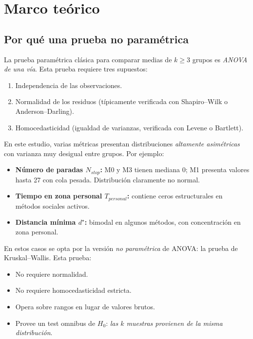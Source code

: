 \documentclass[12pt,a4paper,oneside]{book}
\begin{document}
\section{Marco teórico}

\subsection{Por qué una prueba no paramétrica}

La prueba paramétrica clásica para comparar medias de $k\geq 3$ grupos es \emph{ANOVA de una vía}. Esta prueba requiere tres supuestos:
\begin{enumerate}
    \item Independencia de las observaciones.
    \item Normalidad de los residuos (típicamente verificada con Shapiro--Wilk o Anderson--Darling).
    \item Homocedasticidad (igualdad de varianzas, verificada con Levene o Bartlett).
\end{enumerate}

En este estudio, varias métricas presentan distribuciones \emph{altamente asimétricas} con varianza muy desigual entre grupos. Por ejemplo:

\begin{itemize}
    \item \textbf{Número de paradas $N_{stop}$:} M0 y M3 tienen mediana 0; M1 presenta valores hasta 27 con cola pesada. Distribución claramente no normal.
    \item \textbf{Tiempo en zona personal $T_{personal}$:} contiene ceros estructurales en métodos sociales activos.
    \item \textbf{Distancia mínima $d^\star$:} bimodal en algunos métodos, con concentración en zona personal.
\end{itemize}

En estos casos se opta por la versión \emph{no paramétrica} de ANOVA: la prueba de Kruskal--Wallis. Esta prueba:
\begin{itemize}
    \item No requiere normalidad.
    \item No requiere homocedasticidad estricta.
    \item Opera sobre rangos en lugar de valores brutos.
    \item Provee un test omnibus de $H_0$: \emph{las $k$ muestras provienen de la misma distribución}.
\end{itemize}
\end{document}
